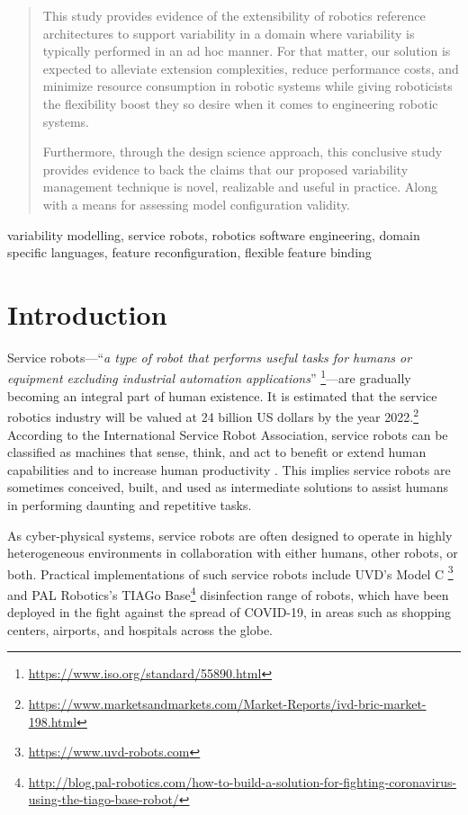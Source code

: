 \documentclass[conference]{IEEEtran}
\newcommand{\foot}[1]{\footnote{\url{#1}}}
\begin{document}
\begin{abstract}
This study provides evidence of the extensibility of robotics reference architectures to support variability in a domain where variability is typically performed in an ad hoc manner. For that matter, our solution is expected to alleviate extension complexities, reduce performance costs, and minimize resource consumption in robotic systems while giving roboticists the flexibility boost they so desire when it comes to engineering robotic systems.

Furthermore, through the design science approach, this conclusive study provides evidence to back the claims that our proposed variability management technique is novel, realizable and useful in practice. Along with a means for assessing model configuration validity.
\end{abstract}

\begin{IEEEkeywords}
variability modelling, service robots, robotics software engineering, domain specific languages, feature reconfiguration, flexible feature binding
\end{IEEEkeywords}

\section{Introduction}
\label{section:intro}
Service robots---``{\em a type of robot that performs useful tasks for humans or equipment excluding industrial automation applications}'' \foot{https://www.iso.org/standard/55890.html}---are gradually becoming an integral part of human existence. It is estimated that the service robotics industry will be valued at 24 billion US dollars by the year 2022.\foot{https://www.marketsandmarkets.com/Market-Reports/ivd-bric-market-198.html}
According to the International Service Robot Association, service robots can be classified as machines that sense, think, and act to benefit or extend human capabilities and to increase human productivity \cite{serv-rob-his}. This implies service robots are sometimes conceived, built, and used as intermediate solutions to assist humans in performing daunting and repetitive tasks.

As cyber-physical systems, service robots are often designed to operate in highly heterogeneous environments in collaboration with either humans, other robots, or both. Practical implementations of such service robots include UVD's Model C \foot{https://www.uvd-robots.com} and PAL Robotics's TIAGo Base\foot{http://blog.pal-robotics.com/how-to-build-a-solution-for-fighting-coronavirus-using-the-tiago-base-robot/} 
disinfection range of robots, which have been deployed in the fight against the spread of COVID-19, in areas such as shopping centers, airports, and hospitals across the globe.
\end{document}
